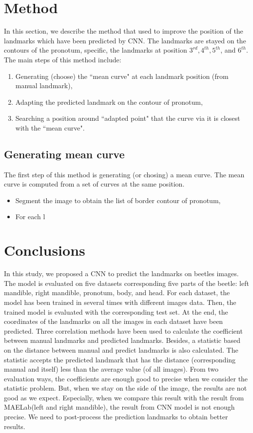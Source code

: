 \documentclass[12pt,a4paper]{article}
\begin{document}
\section{Method}
In this section, we describe the method that used to improve the position of the landmarks which have been predicted by CNN. The landmarks are stayed on the contours of the pronotum, specific, the landmarks at position $3^{rd}, 4^{th}, 5^{th}$, and $6^{th}$. The main steps of this method include:
\begin{enumerate}
	\item Generating (choose) the ``mean curve" at each landmark position (from manual landmark),
	\item Adapting the predicted landmark on the contour of pronotum,
	\item Searching a position around ``adapted point" that the curve via it is closest with the ``mean curve".
\end{enumerate}
\subsection*{Generating mean curve}
The first step of this method is generating (or chosing) a mean curve. The mean curve is computed from a set of curves at the same position. 
\begin{itemize}
	\item Segment the image to obtain the list of border contour of pronotum,
	\item For each l
\end{itemize}
\section{Conclusions}
In this study, we proposed a CNN to predict the landmarks on beetles images. The model is evaluated on five datasets corresponding five parts of the beetle: left mandible, right mandible, pronotum, body, and head. For each dataset, the model has been trained in several times with different images data. Then, the trained model is evaluated with the corresponding test set. At the end, the coordinates of the landmarks on all the images in each dataset have been predicted. Three correlation methods have been used to calculate the coefficient between manual landmarks and predicted landmarks. Besides, a statistic based on the distance between manual and predict landmarks is also calculated. The statistic accepts the predicted landmark that has the distance (corresponding manual and itself) less than the average value (of all images). From two evaluation ways, the coefficients are enough good to precise when we consider the statistic problem. But, when we stay on the side of the image, the results are not good as we expect. Especially, when we compare this result with the result from MAELab(left and right mandible), the result from CNN model is not enough precise. We need to post-process the prediction landmarks to obtain better results.


\pagebreak
\end{document}
